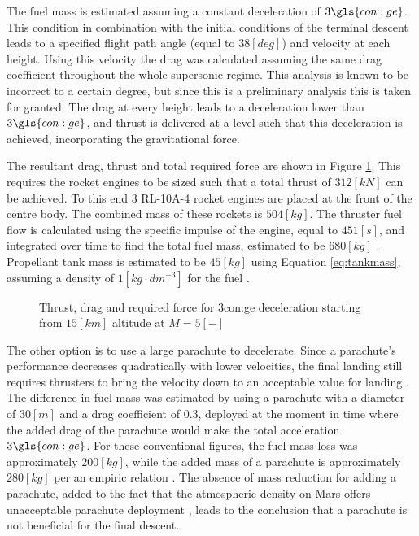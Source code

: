 The fuel mass is estimated assuming a constant deceleration of $3\gls{con:ge}$. This condition in combination with the initial conditions of the terminal descent leads to a specified flight path angle (equal to $38 [deg]$) and velocity at each height. Using this velocity the drag was calculated assuming the same drag coefficient throughout the whole supersonic regime. This analysis is known to be incorrect to a certain degree, but since this is a preliminary analysis this is taken for granted. The drag at every height leads to a deceleration lower than $3\gls{con:ge}$, and thrust is delivered at a level such that this deceleration is achieved, incorporating the gravitational force. 

The resultant drag, thrust and total required force are shown in Figure \ref{fig:TDforce}. This requires the rocket engines to be sized such that a total thrust of $312 \left[kN\right]$ can be achieved. To this end 3 RL-10A-4 rocket engines are placed at the front of the centre body. The combined mass of these rockets is $504 \left[kg\right]$. The thruster fuel flow is calculated using the specific impulse of the engine, equal to $451 \left[s\right]$, and integrated over time to find the total fuel mass, estimated to be $680 \left[kg\right]$ \cite[p.538]{Wertz2011}. Propellant tank mass is estimated to be $45 \left[kg\right]$ using Equation \ref{eq:tankmass}, assuming a density of $1 [kg\cdot dm^{-3}]$ for the fuel \cite[p.543]{Wertz2011}.

\begin{figure}[h]
	\centering
	\setlength{} 
	\setlength{}
	
	\caption{Thrust, drag and required force for 3\gls{con:ge} deceleration starting from $15 \left[km\right]$ altitude at $M=5 \left[-\right]$}
	\label{fig:TDforce}
\end{figure}


The other option is to use a large parachute to decelerate. Since a parachute's performance decreases quadratically with lower velocities, the final landing still requires thrusters to bring the velocity down to an acceptable value for landing \cite{Braun2007}. The difference in fuel mass was estimated by using a parachute with a diameter of $30 \left[m\right]$ and a drag coefficient of $0.3$, deployed at the moment in time where the added drag of the parachute would make the total acceleration $3\gls{con:ge}$. For these conventional figures, the fuel mass loss was approximately $200 \left[kg\right]$, while the added mass of a parachute is approximately $280 \left[kg\right]$ per an empiric relation \cite{Anderson1969}. The absence of mass reduction for adding a parachute, added to the fact that the atmospheric density on Mars offers unacceptable parachute deployment \cite{Korzun2009}, leads to the conclusion that a parachute is not beneficial for the final descent.

